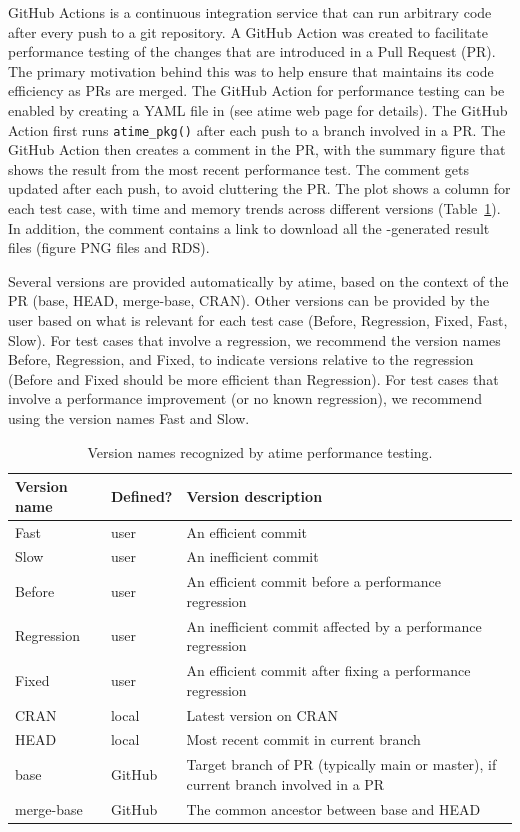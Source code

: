 GitHub Actions is a continuous integration service that can run arbitrary code after every push to a git repository.
A GitHub Action was created to facilitate performance testing of the changes that are introduced in a Pull Request (PR). 
The primary motivation behind this was to help ensure that  maintains its code efficiency as PRs are merged.
The GitHub Action for performance testing can be enabled by creating a YAML file in  (see atime web page for details).
The GitHub Action first runs \verb|atime_pkg()| after each push to a branch involved in a PR.
The GitHub Action then creates a comment in the PR, with the summary figure that shows the result from the most recent performance test.
The comment gets updated after each push, to avoid cluttering the PR.
The plot shows a column for each test case, with time and memory trends across different  versions (Table~\ref{tab:version-labels}).
In addition, the comment contains a link to download all the -generated result files (figure PNG files and RDS).

Several versions are provided automatically by atime, based on the context of the PR (base, HEAD, merge-base, CRAN).
Other versions can be provided by the user based on what is relevant for each test case (Before, Regression, Fixed, Fast, Slow).
For test cases that involve a regression, we recommend the version names Before, Regression, and Fixed, to indicate versions relative to the regression (Before and Fixed should be more efficient than Regression).
For test cases that involve a performance improvement (or no known regression), we recommend using the version names Fast and Slow.
\begin{table}[t]
        \centering
            \caption{\label{tab:version-labels}Version names recognized by atime performance testing. }
        \begin{tabular}    
        {|m{2.2cm}|m{1.5cm}|m{9cm}|}
  \hline
      \textbf{Version name} & \textbf{Defined?} & \textbf{Version description} \\
  \hline
  Fast & user & An efficient commit \\
  \hline
  Slow & user & An inefficient commit\\
  \hline
  Before & user & An efficient commit before a performance regression  \\
  \hline
  Regression & user & An inefficient commit affected by a performance regression \\
  \hline  
   Fixed & user & An efficient commit after  fixing a performance regression \\
  \hline  
  CRAN & local & Latest version on CRAN  \\
  \hline
  HEAD & local &  Most recent commit in current branch \\
  \hline
  base & GitHub & Target branch of PR (typically main or master), if current branch involved in a PR \\
  \hline
  merge-base & GitHub & The common ancestor between base and HEAD \\
  \hline
    \end{tabular}
\end{table}



